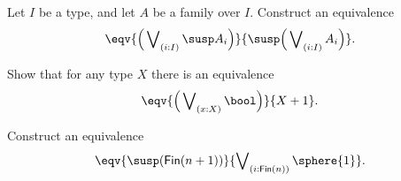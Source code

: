 \begin{exercises}
\item 
\begin{subexenum}
\item Let $I$ be a type, and let $A$ be a family over $I$. Construct an equivalence
\begin{equation*}
\eqv{\Big(\bigvee\nolimits_{(i:I)}\susp A_i\Big)}{\susp\Big(\bigvee\nolimits_{(i:I)}A_i\Big)}.
\end{equation*}
\item Show that for any type $X$ there is an equivalence
\begin{equation*}
\eqv{\Big(\bigvee\nolimits_{(x:X)}\bool\Big)}{X+1}.
\end{equation*}
\item Construct an equivalence
\begin{equation*}
\eqv{\susp(\mathsf{Fin}(n+1))}{\bigvee\nolimits_{(i:\mathsf{Fin}(n))}\sphere{1}}.
\end{equation*}
\end{subexenum}
\end{exercises}
